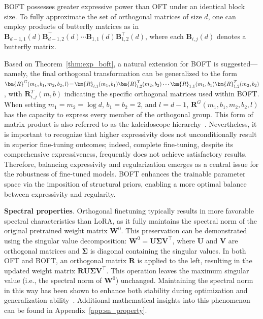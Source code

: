 \begin{theorem}\label{thm:exp_boft}
    BOFT possesses greater expressive power than OFT under an identical block size. To fully approximate the set of orthogonal matrices of size $d$, one can employ products of butterfly matrices as in $\bm{B}_{d-1,1}(d)\bm{B}^\top_{d-1,2}(d)\cdots\bm{B}_{1,1}(d)\bm{B}^\top_{1,2}(d)$, where each $\bm{B}_{i,j}(d)$ denotes a butterfly matrix.
\end{theorem}

Based on Theorem~\ref{thm:exp_boft}, a natural extension for BOFT is suggested—namely, the final orthogonal transformation can be generalized to the form $\thickmuskip=2mu \medmuskip=2mu \bm{R}^G(m_1,b_1,m_2,b_2,l)=\bm{R}_{l,1}(m_1,b_1)\bm{R}_{l,2}^T(m_2,b_2)\cdots\bm{R}_{1,1}(m_1,b_1)\bm{R}_{1,2}^T(m_2,b_2)$, with $\bm{R}_{i,j}^T(m,b)$ indicating the specific orthogonal matrices used within BOFT. When setting $m_1=m_2=\log d$, $b_1=b_2=2$, and $l=d-1$, $\bm{R}^G(m_1,b_1,m_2,b_2,l)$ has the capacity to express every member of the orthogonal group. This form of matrix product is also referred to as the kaleidoscope hierarchy~\cite{dao2019kaleidoscope}. Nevertheless, it is important to recognize that higher expressivity does not unconditionally result in superior fine-tuning outcomes; indeed, complete fine-tuning, despite its comprehensive expressiveness, frequently does not achieve satisfactory results. Therefore, balancing expressivity and regularization emerges as a central issue for the robustness of fine-tuned models. BOFT enhances the trainable parameter space via the imposition of structural priors, enabling a more optimal balance between expressivity and regularity.

\textbf{Spectral properties}. Orthogonal finetuning typically results in more favorable spectral characteristics than LoRA, as it fully maintains the spectral norm of the original pretrained weight matrix $\bm{W}^0$. This preservation can be demonstrated using the singular value decomposition: $\bm{W}^0 = \bm{U}\bm{\Sigma}\bm{V}^\top$, where $\bm{U}$ and $\bm{V}$ are orthogonal matrices and $\bm{\Sigma}$ is diagonal containing the singular values. In both OFT and BOFT, an orthogonal matrix $\bm{R}$ is applied to the left, resulting in the updated weight matrix $\bm{R}\bm{U}\bm{\Sigma}\bm{V}^\top$. This operation leaves the maximum singular value (i.e., the spectral norm of $\bm{W}^0$) unchanged. Maintaining the spectral norm in this way has been shown to enhance both stability during optimization and generalization ability~\cite{miyato2018spectral,yoshida2017spectral}. Additional mathematical insights into this phenomenon can be found in Appendix~\ref{app:sn_property}.

